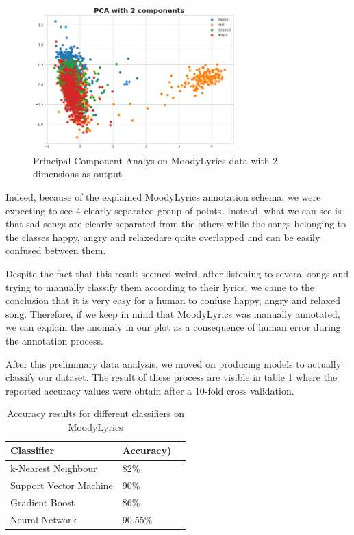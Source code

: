 \begin{figure}[H]
  \centering
  \includegraphics[width=0.7\textwidth]{./chapters/chapter4/images/ml-pca.png}
  \caption{Principal Component Analys on MoodyLyrics data with 2 dimensions as output}
  \label{fig:ml-pca}
\end{figure}

Indeed, because of the explained MoodyLyrics annotation schema, we were expecting to see 4 clearly separated group of points. Instead, what we can see is that sad songs are clearly separated from the others while the songs belonging to the classes happy, angry and relaxedare quite overlapped and can be easily confused between them.

Despite the fact that this result seemed weird, after listening to several songs and trying to
manually classify them according to their lyrics, we came to the conclusion that it is very
easy for a human to confuse happy, angry and relaxed song. Therefore, if we keep in mind that
MoodyLyrics was manually annotated, we can explain the anomaly in our plot as a consequence of human error during the annotation process.


After this preliminary data analysis, we moved on producing models to actually classify our dataset.
The result of these process are visible in table \ref{table:ml-simple-results} where the reported accuracy values were obtain after a 10-fold cross validation.
\begin{table}[H]
\centering
\begin{tabular}{@{}lll@{}}
\toprule
\textbf{Classifier} & \textbf{Accuracy})   \\ \midrule
k-Nearest Neighbour & 82\%  \\
Support Vector Machine & 90\%  \\
Gradient Boost & 86\%  \\
Neural Network & 90.55\%  \\
\end{tabular}
\caption{Accuracy results for different classifiers on MoodyLyrics}
\label{table:ml-simple-results}
\end{table}


